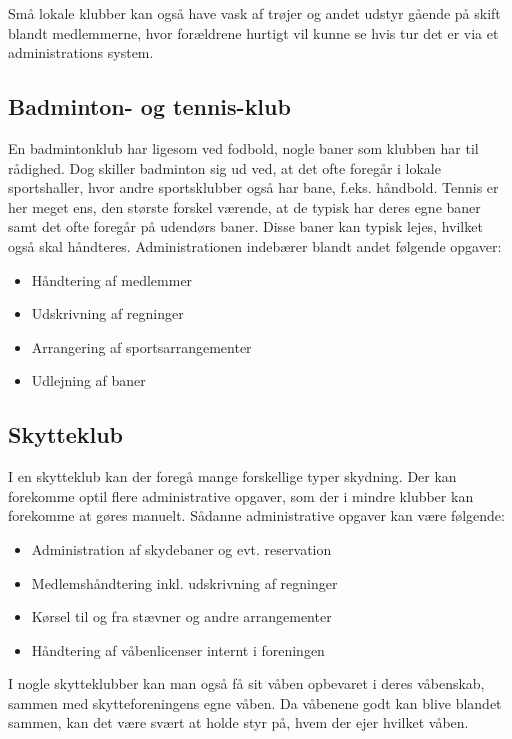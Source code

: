 Små lokale klubber kan også have vask af trøjer og andet udstyr gående på skift blandt medlemmerne, hvor forældrene
hurtigt vil kunne se hvis tur det er via et administrations system.

\subsection{Badminton- og tennis-klub}

En badmintonklub har ligesom ved fodbold, nogle baner som klubben har til rådighed. Dog skiller badminton sig ud ved, at
det ofte foregår i lokale sportshaller, hvor andre sportsklubber også har bane, f.eks. håndbold. Tennis er her meget
ens, den største forskel værende, at de typisk har deres egne baner samt det ofte foregår på udendørs baner. Disse baner kan
typisk lejes, hvilket også skal håndteres. Administrationen indebærer blandt andet følgende opgaver:

\begin{itemize}
\item Håndtering af medlemmer
\item Udskrivning af regninger
\item Arrangering af sportsarrangementer
\item Udlejning af baner
\end{itemize}

\subsection{Skytteklub}

I en skytteklub kan der foregå mange forskellige typer skydning. Der kan forekomme
optil flere administrative opgaver, som der i mindre klubber kan forekomme at gøres manuelt. Sådanne administrative
opgaver kan være følgende:

\begin{itemize}
\item Administration af skydebaner og evt. reservation
\item Medlemshåndtering inkl. udskrivning af regninger
\item Kørsel til og fra stævner og andre arrangementer
\item Håndtering af våbenlicenser internt i foreningen
\end{itemize}

I nogle skytteklubber kan man også få sit våben opbevaret i deres våbenskab, sammen med skytteforeningens egne våben. Da
våbenene godt kan blive blandet sammen, kan det være svært at holde styr på, hvem der ejer hvilket våben.


